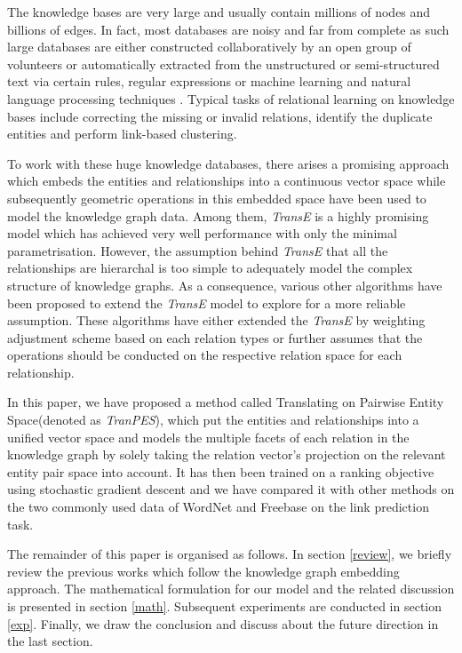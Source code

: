 \documentclass[9pt]{sig-alternate-05-2015}
\begin{document}
The knowledge bases are very large and usually contain millions of nodes and billions of edges. In fact, most databases are noisy and far from complete as such large databases are either constructed collaboratively by an open group of volunteers or  automatically extracted from the unstructured or semi-structured  text via certain rules, regular expressions or machine learning and natural language processing techniques \cite{weikum_information_2010}. Typical tasks of relational learning on knowledge bases include correcting the missing or invalid relations, identify the duplicate entities and perform link-based clustering. 

To work with these huge knowledge databases, there arises a promising approach which embeds the entities and relationships into a continuous vector space while subsequently geometric operations in this embedded space have been used to model the knowledge graph data. Among them, \emph{TransE} \cite{bordes_translating_2013} is a highly promising model which has achieved very well performance with only the minimal parametrisation. However, the assumption behind \emph{TransE} that  all the relationships are hierarchal  is too simple to adequately model the complex structure of  knowledge graphs. As a consequence, various other algorithms \cite{fan_transition-based_2014} \cite{wang_knowledge_2014} \cite{lin_learning_2015} \cite{garcia-duran_composing_2015}  have been proposed to extend the \emph{TransE} model to explore for a more reliable assumption. These algorithms have either extended the \emph{TransE} by weighting adjustment scheme based on each relation types  or further assumes that the operations should be conducted on the respective relation space for each relationship. 

In this paper, we have proposed a method called Translating on Pairwise Entity Space(denoted as \emph{TranPES}),  which  put the entities and relationships into a unified vector space and models the multiple facets of each relation in the knowledge graph by solely  taking the relation vector's projection on the relevant entity pair space into account. It has then been trained on a ranking objective using stochastic gradient descent and we have compared it with other methods on the two commonly used data  of WordNet \cite{miller_wordnet:_1995} and Freebase \cite{bollacker_freebase:_2008} on the link prediction task.

The remainder of this paper is organised as follows. In section \ref{review}, we briefly review the previous works which follow the knowledge graph embedding approach. The mathematical formulation for our model and the related discussion is presented in section \ref{math}. Subsequent experiments are conducted in section \ref{exp}. Finally, we draw the conclusion and discuss about the future direction in the last section.
\end{document}
